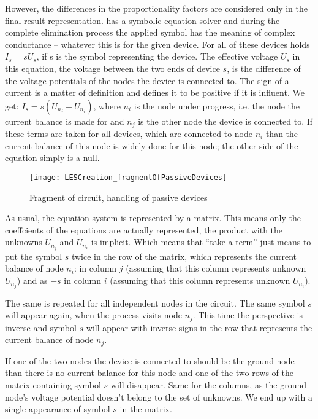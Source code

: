 However, the differences in the proportionality factors are considered
only in the final result representation. \linnet{} has a symbolic equation
solver and during the complete elimination process the applied symbol has
the meaning of complex conductance -- whatever this is for the given
device. For all of these devices holds $I_s=s U_s$, if s is the symbol
representing the device. The effective voltage $U_s$ in this equation, the
voltage between the two ends of device $s$, is the difference of the
voltage potentials of the nodes the device is connected to. The sign of a
current is a matter of definition and \linnet{} defines it to be positive
if it is influent. We get: $I_s=s(U_{n_j} - U_{n_i})$, where $n_i$ is the
node under progress, i.e. the node the current balance is made for and
$n_j$ is the other node the device is connected to. If these terms are
taken for all devices, which are connected to node $n_i$ than the current
balance of this node is widely done for this node; the other side of the
equation simply is a null.

\begin{figure}
  \centering
  \texttt{[image: LESCreation\_fragmentOfPassiveDevices]}
  \caption{Fragment of circuit, handling of passive devices}
  \label{figLESCreation_fragmentOfPassiveDevices}
\end{figure}

As usual, the equation system is represented by a matrix. This means only
the coeffcients of the equations are actually represented, the product
with the unknowns $U_{n_j}$ and $U_{n_i}$ is implicit. Which means that
``take a term'' just means to put the symbol $s$ twice in the row of the
matrix, which represents the current balance of node $n_i$: in column $j$
(assuming that this column represents unknown $U_{n_j}$) and as $-s$ in
column $i$ (assuming that this column represents unknown $U_{n_i}$).

The same is repeated for all independent nodes in the circuit. The same
symbol $s$ will appear again, when the process visits node $n_j$. This
time the perspective is inverse and symbol $s$ will appear with inverse
signs in the row that represents the current balance of node $n_j$.

If one of the two nodes the device is connected to should be the ground
node than there is no current balance for this node and one of the two
rows of the matrix containing symbol $s$ will disappear. Same for the
columns, as the ground node's voltage potential doesn't belong to the set
of unknowns. We end up with a single appearance of symbol $s$ in the
matrix.

